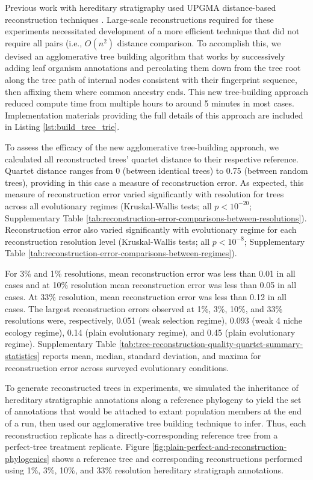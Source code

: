Previous work with hereditary stratigraphy used UPGMA distance-based reconstruction techniques \citep{moreno2022hereditary}.
Large-scale reconstructions required for these experiments necessitated development of a more efficient technique that did not require all pairs (i.e., $O(n^2)$ distance comparison.
To accomplish this, we devised an agglomerative tree building algorithm that works by successively adding leaf organism annotations and percolating them down from the tree root along the tree path of internal nodes consistent with their fingerprint sequence, then affixing them where common ancestry ends.
This new tree-building approach reduced compute time from multiple hours to around 5 minutes in most cases.
Implementation materials providing the full details of this approach are included in Listing \ref{lst:build_tree_trie}.



To assess the efficacy of the new agglomerative tree-building approach, we calculated all reconstructed trees' quartet distance to their respective reference.
Quartet distance ranges from 0 (between identical trees) to 0.75 (between random trees), providing in this case a measure of reconstruction error.
As expected, this measure of reconstruction error varied significantly with resolution for trees across all evolutionary regimes (Kruskal-Wallis tests; all $p < 10^{-20}$; Supplementary Table \ref{tab:reconstruction-error-comparisons-between-resolutions}).
Reconstruction error also varied significantly with evolutionary regime for each reconstruction resolution level (Kruskal-Wallis tests; all $p < 10^{-8}$; Supplementary Table \ref{tab:reconstruction-error-comparisons-between-regimes}).

For 3\% and 1\% resolutions, mean reconstruction error was less than 0.01 in all cases and at 10\% resolution mean reconstruction error was less than 0.05 in all cases.
At 33\% resolution, mean reconstruction error was less than 0.12 in all cases.
The largest reconstruction errors observed at 1\%, 3\%, 10\%, and 33\% resolutions were, respectively, 0.051 (weak selection regime), 0.093 (weak 4 niche ecology regime), 0.14 (plain evolutionary regime), and 0.45 (plain evolutionary regime).
Supplementary Table \ref{tab:tree-reconstruction-quality-quartet-summary-statistics} reports mean, median, standard deviation, and maxima for reconstruction error across surveyed evolutionary conditions.

To generate reconstructed trees in experiments, we simulated the inheritance of hereditary stratigraphic annotations along a reference phylogeny to yield the set of annotations that would be attached to extant population members at the end of a run, then used our agglomerative tree building technique to infer.
Thus, each reconstruction replicate has a directly-corresponding reference tree from a perfect-tree treatment replicate.
Figure \ref{fig:plain-perfect-and-reconstruction-phylogenies} shows a reference tree and corresponding reconstructions performed using 1\%, 3\%, 10\%, and 33\% resolution hereditary stratigraph annotations.

